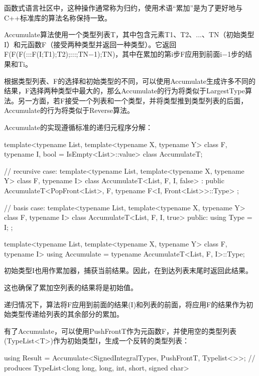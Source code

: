 \begin{notice}
函数式语言社区中，这种操作通常称为归约，使用术语“累加”是为了更好地与C++标准库的算法名称保持一致。
\end{notice}

Accumulate算法使用一个类型列表T，其中包含元素T1、T2、...、TN（初始类型I）和元函数F（接受两种类型并返回一种类型）。它返回F(F(F(:::F(I;T1);T2);:::;TN−1);TN)，其中在累加的第i步F应用到前面i−1步的结果和Ti。

根据类型列表、F的选择和初始类型的不同，可以使用Accumulate生成许多不同的结果，F选择两种类型中最大的，那么Accumulate的行为将类似于LargestType算法。另一方面，若F接受一个列表和一个类型，并将类型推到类型列表的后面，Accumulate的行为将类似于Reverse算法。

Accumulate的实现遵循标准的递归元程序分解：

\begin{cpp}
template<typename List,
		template<typename X, typename Y> class F,
		typename I,
		bool = IsEmpty<List>::value>
class AccumulateT;

// recursive case:
template<typename List,
		template<typename X, typename Y> class F,
		typename I>
class AccumulateT<List, F, I, false>
: public AccumulateT<PopFront<List>, F,
					typename F<I, Front<List>>::Type>
{
};

// basis case:
template<typename List,
		template<typename X, typename Y> class F,
		typename I>
class AccumulateT<List, F, I, true>
{
	public:
	using Type = I;
};

template<typename List,
		template<typename X, typename Y> class F,
		typename I>
using Accumulate = typename AccumulateT<List, F, I>::Type;
\end{cpp}

初始类型I也用作累加器，捕获当前结果。因此，在到达列表末尾时返回此结果。

\begin{notice}
这也确保了累加空列表的结果将是初始值。
\end{notice}

递归情况下，算法将F应用到前面的结果(I)和列表的前面，将应用F的结果作为初始类型传递给列表的其余部分的累加。

有了Accumulate，可以使用PushFrontT作为元函数F，并使用空的类型列表(TypeList<T>)作为初始类型I，生成一个反转的类型列表：

\begin{cpp}
using Result = Accumulate<SignedIntegralTypes, PushFrontT, Typelist<>>;
				// produces TypeList<long long, long, int, short, signed char>
\end{cpp}

